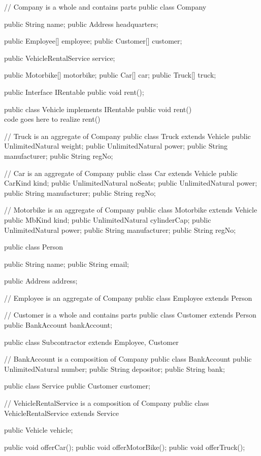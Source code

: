 \documentclass{article}
\begin{document}
\begin{spverbatim}

// Company is a whole and contains parts
public class Company{
    public String name;
    public Address headquarters;
    
    public Employee[] employee;
    public Customer[] customer;
     
    public VehicleRentalService service;
    
    public Motorbike[] motorbike;
    public Car[] car;
    public Truck[] truck;
}
	
public Interface IRentable{
    public void rent();
}

public class Vehicle implements IRentable{
    public void rent(){ \\ code goes here to realize rent() }
}

// Truck is an aggregate of Company
public class Truck extends Vehicle{
    public UnlimitedNatural weight;
    public UnlimitedNatural power;
    public String manufacturer;
    public String regNo;
}

// Car is an aggregate of Company
public class Car extends Vehicle{
    public CarKind kind;
    public UnlimitedNatural noSeats;
    public UnlimitedNatural power;
    public String manufacturer;
    public String regNo;
}

// Motorbike is an aggregate of Company
public class Motorbike extends Vehicle{
    public MbKind kind;
    public UnlimitedNatural cylinderCap;
    public UnlimitedNatural power;
    public String manufacturer;
    public String regNo;
}

public class Person{
    public String name;
    public String email;
    
    public Address address;
}

// Employee is an aggregate of Company
public class Employee extends Person{}

// Customer is a whole and contains parts
public class Customer extends Person{
    public BankAccount bankAccount;
}

public class Subcontractor extends Employee, Customer{}

// BankAccount is a composition of Company
public class BankAccount{
    public UnlimitedNatural number;
    public String depositor;
    public String bank;
}

public class Service{
    public Customer customer;
}

// VehicleRentalService is a composition of Company
public class VehicleRentalService extends Service{
    public Vehicle vehicle;
    
    public void offerCar();
    public void offerMotorBike();
    public void offerTruck();
}

\end{spverbatim}
\end{document}
